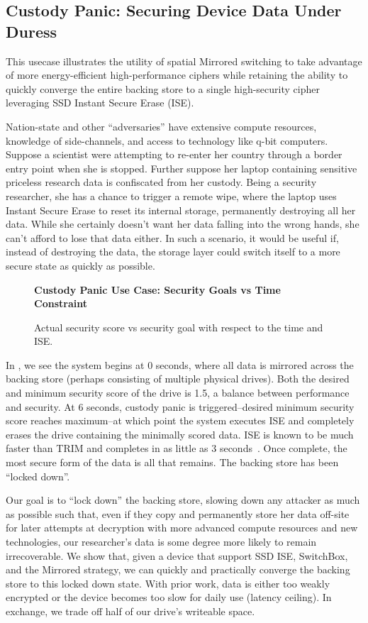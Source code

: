\subsection{Custody Panic: Securing Device Data Under Duress}

This usecase illustrates the utility of spatial Mirrored switching to take
advantage of more energy-efficient high-performance ciphers while retaining the
ability to quickly converge the entire backing store to a single high-security
cipher leveraging SSD Instant Secure Erase (ISE).

Nation-state and other ``adversaries'' have extensive compute resources,
knowledge of side-channels, and access to technology like q-bit computers.
Suppose a scientist were attempting to re-enter her country through a border
entry point when she is stopped. Further suppose her laptop containing sensitive
priceless research data is confiscated from her custody. Being a security
researcher, she has a chance to trigger a remote wipe, where the laptop uses
Instant Secure Erase to reset its internal storage, permanently destroying all
her data. While she certainly doesn't want her data falling into the wrong
hands, she can't afford to lose that data either. In such a scenario, it would
be useful if, instead of destroying the data, the storage layer could switch
itself to a more secure state as quickly as possible.

\begin{figure}[ht] \textbf{Custody Panic Use Case: Security Goals vs Time
Constraint}\par\medskip
   \centering
   {} \caption{Actual security score vs
   security goal with respect to the time and ISE.}
  \label{fig:usecase-custody}
\end{figure}

In , we see the system begins at 0 seconds, where
all data is mirrored across the backing store (perhaps consisting of multiple
physical drives). Both the desired and minimum security score of the drive is
1.5, a balance between performance and security. At 6 seconds, custody panic is
triggered--desired minimum security score reaches maximum--at which point the
system executes ISE and completely erases the drive containing the minimally
scored data. ISE is known to be much faster than TRIM and completes in as little
as 3 seconds~\cite{SeaGate,Samsung,ThatOtherOEM}. Once complete, the most secure
form of the data is all that remains. The backing store has been ``locked
down''.

Our goal is to ``lock down'' the backing store, slowing down any attacker as
much as possible such that, even if they copy and permanently store her data
off-site for later attempts at decryption with more advanced compute resources
and new technologies, our researcher's data is some degree more likely to remain
irrecoverable. We show that, given a device that support SSD ISE, SwitchBox, and
the Mirrored strategy, we can quickly and practically converge the backing store
to this locked down state. With prior work, data is either too weakly encrypted
or the device becomes too slow for daily use (latency ceiling). In exchange, we
trade off half of our drive's writeable space.
